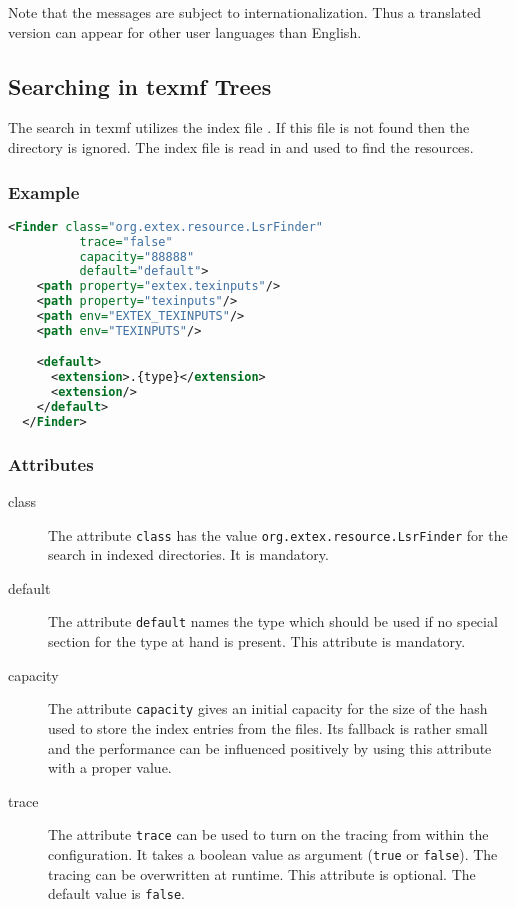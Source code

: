 Note that the messages are subject to internationalization. Thus a
translated version can appear for other user languages than English.


\subsection{Searching in texmf Trees}

The search in texmf utilizes the index file . If this file
is not found then the directory is ignored. The index file 
is read in and used to find the resources.

\subsubsection*{Example}

\begin{lstlisting}[language=XML]
  <Finder class="org.extex.resource.LsrFinder"
          trace="false"
          capacity="88888"
          default="default">
    <path property="extex.texinputs"/>
    <path property="texinputs"/>
    <path env="EXTEX_TEXINPUTS"/>
    <path env="TEXINPUTS"/>

    <default>
      <extension>.{type}</extension>
      <extension/>
    </default>
  </Finder>
\end{lstlisting}

\subsubsection*{Attributes}
\begin{description}
\item[class] The attribute \texttt{class} has the value
  \texttt{org.extex.resource.LsrFinder} for the search in indexed
  directories. It is mandatory.
\item[default] The attribute \texttt{default} names the type which
  should be used if no special section for the type at hand is
  present. This attribute is mandatory.
\item[capacity] The attribute \texttt{capacity} gives an initial
  capacity for the size of the hash used to store the index entries
  from the  files. Its fallback is rather small and the
  performance can be influenced positively by using this attribute
  with a proper value.
\item[trace] The attribute \texttt{trace} can be used to turn on the
  tracing from within the configuration. It takes a boolean value as
  argument (\texttt{true} or \texttt{false}). The tracing can be
  overwritten at runtime. This attribute is optional. The default
  value is \texttt{false}.
\end{description}

